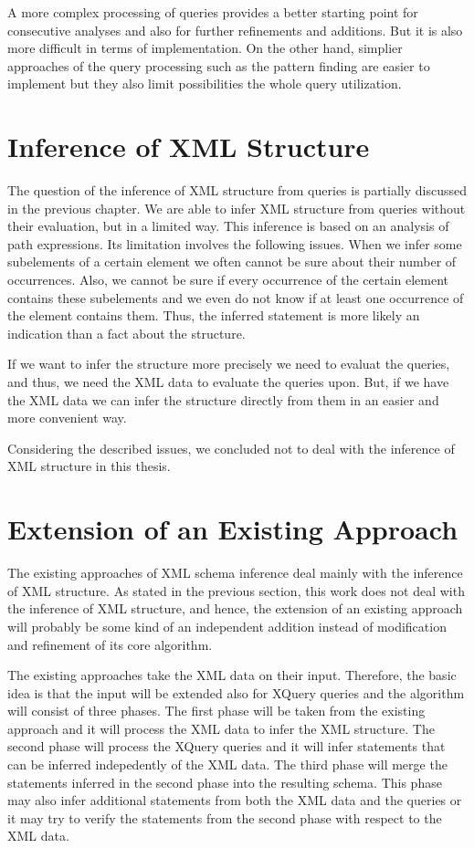 A more complex processing of queries provides a better starting point for consecutive analyses and also for further refinements and additions. But it is also more difficult in terms of implementation. On the other hand, simplier approaches of the query processing such as the pattern finding are easier to implement but they also limit possibilities the whole query utilization.


\section{Inference of XML Structure}
The question of the inference of XML structure from queries is partially discussed in the previous chapter. We are able to infer XML structure from queries without their evaluation, but in a limited way. This inference is based on an analysis of path expressions. Its limitation involves the following issues. When we infer some subelements of a certain element we often cannot be sure about their number of occurrences. Also, we cannot be sure if every occurrence of the certain element contains these subelements and we even do not know if at least one occurrence of the element contains them. Thus, the inferred statement is more likely an indication than a fact about the structure.

If we want to infer the structure more precisely we need to evaluat the queries, and thus, we need the XML data to evaluate the queries upon. But, if we have the XML data we can infer the structure directly from them in an easier and more convenient way.

Considering the described issues, we concluded not to deal with the inference of XML structure in this thesis.

\section{Extension of an Existing Approach}
The existing approaches of XML schema inference deal mainly with the inference of XML structure. As stated in the previous section, this work does not deal with the inference of XML structure, and hence, the extension of an existing approach will probably be some kind of an independent addition instead of modification and refinement of its core algorithm.

The existing approaches take the XML data on their input. Therefore, the basic idea is that the input will be extended also for XQuery queries and the algorithm will consist of three phases. The first phase will be taken from the existing approach and it will process the XML data to infer the XML structure. The second phase will process the XQuery queries and it will infer statements that can be inferred indepedently of the XML data. The third phase will merge the statements inferred in the second phase into the resulting schema. This phase may also infer additional statements from both the XML data and the queries or it may try to verify the statements from the second phase with respect to the XML data.